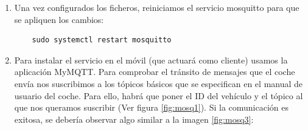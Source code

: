 \begin{enumerate}
\item Una vez configurados los ficheros, reiniciamos el servicio mosquitto para que se apliquen los cambios:
\begin{lstlisting}
	sudo systemctl restart mosquitto
\end{lstlisting}

\item Para instalar el servicio en el móvil (que actuará como cliente) usamos la aplicación MyMQTT. Para comprobar el tránsito de mensajes que el coche envía nos suscribimos a los tópicos básicos que se especifican en el manual de usuario del coche. Para ello, habrá que poner el ID del vehículo y el tópico al que nos queramos suscribir (Ver figura \ref{fig:mosq1}). Si la comunicación es exitosa, se debería observar algo similar a la imagen \ref{fig:mosq3}:


\end{enumerate}
